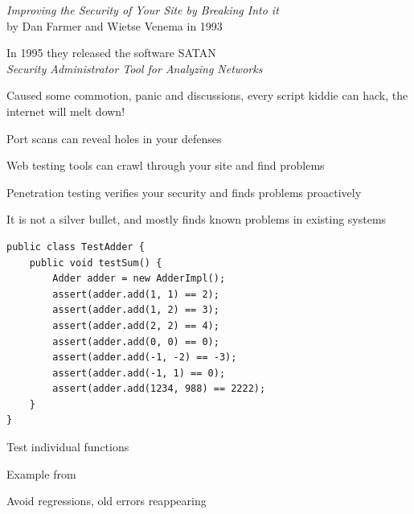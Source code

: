 \documentclass[Screen16to9,17pt]{foils}
\begin{document}
\begin{list2}
\item \emph{Improving the Security of Your Site by Breaking Into it}\\ by
Dan Farmer and Wietse Venema in 1993
\item In 1995 they released the software SATAN\\
\emph{Security Administrator Tool for Analyzing Networks}
\item Caused some commotion, panic and discussions, every script kiddie can hack, the internet will melt down!
\end{list2}




\begin{list1}
\item Port scans can reveal holes in your defenses
\item Web testing tools can crawl through your site and find problems
\item Penetration testing verifies your security and finds problems proactively
\item It is not a silver bullet, and mostly finds known problems in existing systems
\end{list1}






\begin{verbatim}
public class TestAdder {
    public void testSum() {
        Adder adder = new AdderImpl();
        assert(adder.add(1, 1) == 2);
        assert(adder.add(1, 2) == 3);
        assert(adder.add(2, 2) == 4);
        assert(adder.add(0, 0) == 0);
        assert(adder.add(-1, -2) == -3);
        assert(adder.add(-1, 1) == 0);
        assert(adder.add(1234, 988) == 2222);
    }
}
\end{verbatim}

\begin{list1}
\item Test individual functions
\item Example from 
\item Avoid regressions, old errors reappearing
\end{list1}
\end{document}

